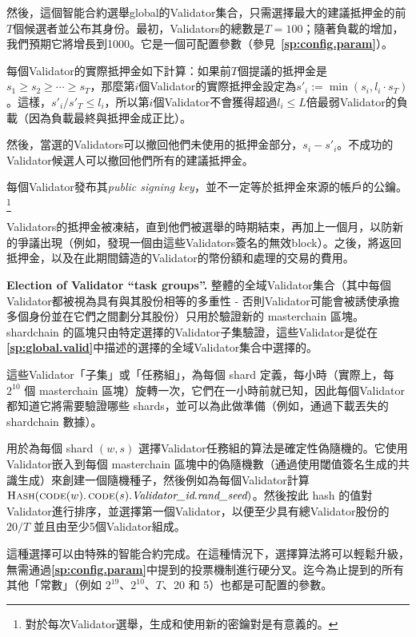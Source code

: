 \documentclass[12pt,oneside]{article}
\def\makepoint#1{\medbreak\noindent{\bf #1.\ }}
\def\nxsubpoint{\refstepcounter{subsubsection}%
  \smallbreak\makepoint{\thesubsubsection}}
\def\refpoint#1{{\rm\textbf{\ref{#1}}}}
\let\ptref=\refpoint
\def\embt(#1.){\textbf{#1.}}
\let\vr=\textit
\def\opsc#1{\operatorname{\textsc{#1}}}
\def\Hash{\opsc{Hash}}
\def\code{\opsc{code}}
\begin{document}
然後，這個智能合約選舉global的Validator集合，只需選擇最大的建議抵押金的前$T$個候選者並公布其身份。最初，Validators的總數是$T=100$；隨著負載的增加，我們預期它將增長到1000。它是一個可配置參數（參見~\ptref{sp:config.param}）。

每個Validator的實際抵押金如下計算：如果前$T$個提議的抵押金是$s_1\geq s_2\geq\cdots\geq s_T$，那麼第$i$個Validator的實際抵押金設定為$s'_i:=\min(s_i,l_i\cdot s_T)$。這樣，$s'_i/s'_T\leq l_i$，所以第$i$個Validator不會獲得超過$l_i\leq L$倍最弱Validator的負載（因為負載最終與抵押金成正比）。

然後，當選的Validators可以撤回他們未使用的抵押金部分，$s_i-s'_i$。不成功的Validator候選人可以撤回他們所有的建議抵押金。

每個Validator發布其{\em public signing key}，並不一定等於抵押金來源的帳戶的公鑰。\footnote{對於每次Validator選舉，生成和使用新的密鑰對是有意義的。}

Validators的抵押金被凍結，直到他們被選舉的時期結束，再加上一個月，以防新的爭議出現（例如，發現一個由這些Validators簽名的無效block）。之後，將返回抵押金，以及在此期間鑄造的Validator的幣份額和處理的交易的費用。


\nxsubpoint\label{sp:val.task.grp} \embt(Election of Validator ``task
groups''.)  整體的全域Validator集合（其中每個Validator都被視為具有與其股份相等的多重性 - 否則Validator可能會被誘使承擔多個身份並在它們之間劃分其股份）只用於驗證新的 masterchain 區塊。 shardchain 的區塊只由特定選擇的Validator子集驗證，這些Validator是從在\ptref{sp:global.valid}中描述的選擇的全域Validator集合中選擇的。

這些Validator「子集」或「任務組」，為每個 shard 定義，每小時（實際上，每 $2^{10}$ 個 masterchain 區塊）旋轉一次，它們在一小時前就已知，因此每個Validator都知道它將需要驗證哪些 shards，並可以為此做準備（例如，通過下載丟失的 shardchain 數據）。

用於為每個 shard $(w,s)$ 選擇Validator任務組的算法是確定性偽隨機的。它使用Validator嵌入到每個 masterchain 區塊中的偽隨機數（通過使用閾值簽名生成的共識生成）來創建一個隨機種子，然後例如為每個Validator計算 $\Hash(\code(w).\code(s).\vr{Validator\_id}.\vr{rand\_seed})$。然後按此 hash 的值對Validator進行排序，並選擇第一個Validator，以便至少具有總Validator股份的 $20/T$ 並且由至少5個Validator組成。

這種選擇可以由特殊的智能合約完成。在這種情況下，選擇算法將可以輕鬆升級，無需通過\ptref{sp:config.param}中提到的投票機制進行硬分叉。迄今為止提到的所有其他「常數」（例如 $2^{19}$、$2^{10}$、$T$、20 和 5）也都是可配置的參數。
\end{document}
